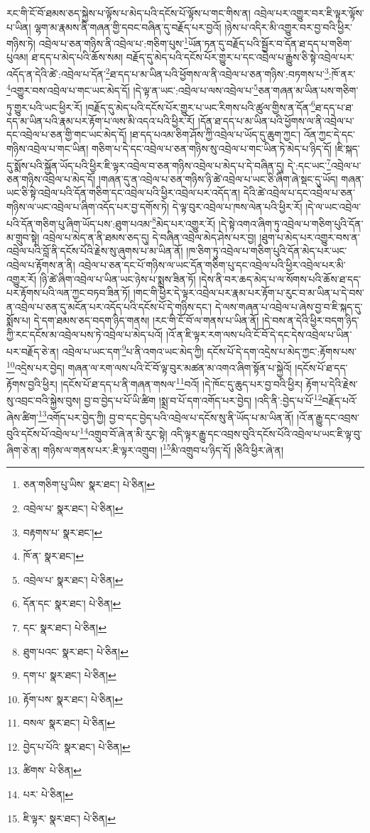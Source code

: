 རང་གི་ངོ་བོ་ཐམས་ཅད་སྐྱེས་པ་ལྟོས་པ་མེད་པའི་དངོས་པོ་ལྟོས་པ་གང་གིས་ན། འབྲེལ་པར་འགྱུར་བར་ཇི་ལྟར་ལྟོས་པ་ཡིན། ལྷག་མ་རྣམས་ནི་གཞན་གྱི་དབང་བཞིན་དུ་བརྗོད་པར་བྱའོ། །ཉེས་པ་འདིར་མི་འགྱུར་བར་བྱ་བའི་ཕྱིར་གཉིས་ཏེ། འབྲེལ་པ་ཅན་གཉིས་ནི་འབྲེལ་པ་:གཅིག་པུས་\footnote{ཅན་གཅིག་པུ་ཡིས་  སྣར་ཐང་།  པེ་ཅིན། }ཡོན་ཏན་དུ་བརྗོད་པའི་སྦྱོར་བ་དོན་ཐ་དད་པ་གཅིག་པུའམ། ཐ་དད་པ་མེད་པའི་ཆོས་སམ། བརྗོད་དུ་མེད་པའི་དངོས་པོར་གྱུར་པ་དང་འབྲེལ་པ་རྒྱུས་ཅི་སྟེ་འབྲེལ་པར་འདོད་ན་དེའི་ཚེ་:འབྲེལ་པ་དོན་\footnote{འབྲེལ་པ་  སྣར་ཐང་།  པེ་ཅིན། }ཐ་དད་པ་མ་ཡིན་པའི་ཕྱོགས་ལ་ནི་འབྲེལ་པ་ཅན་གཉིས་:བཏགས་པ་\footnote{བརྟགས་པ་  སྣར་ཐང་། }:ཁོ་ནར་\footnote{ཁོ་ན་  སྣར་ཐང་། }འགྱུར་བས་འབྲེལ་པ་གང་ཡང་མེད་དོ། །དེ་ལྟ་ན་ཡང་:འབྲེལ་པ་ལས་འབྲེལ་པ་\footnote{འབྲེལ་པ་  སྣར་ཐང་།  པེ་ཅིན། }ཅན་གཞན་མ་ཡིན་པས་གཅིག་ཏུ་གྱུར་པའི་ཡང་ཕྱིར་རོ། །བརྗོད་དུ་མེད་པའི་དངོས་པོར་གྱུར་པ་ཡང་རིགས་པའི་ཚུལ་གྱིས་ན་དོན་\footnote{དོན་དང་  སྣར་ཐང་།  པེ་ཅིན། }ཐ་དད་པ་ཐ་དད་མ་ཡིན་པའི་རྣམ་པར་རྟོག་པ་ལས་མི་འདའ་པའི་ཕྱིར་རོ། །དོན་ཐ་དད་པ་མ་ཡིན་པའི་ཕྱོགས་ལ་ནི་འབྲེལ་པ་དང་འབྲེལ་པ་ཅན་གྱི་གང་ཡང་མེད་དོ། །ཐ་དད་པའམ་ཅིག་ཤོས་ཀྱི་འབྲེལ་པ་ཡོད་དུ་ཆུག་ཀྱང་། འོན་ཀྱང་དེ་དང་གཉིས་འབྲེལ་པ་གང་ཡིན། གཅིག་པ་དེ་དང་འབྲེལ་པ་ཅན་གཉིས་སུ་འབྲེལ་པ་གང་ཡིན་ཏེ་མེད་པ་ཉིད་དོ། །ཇི་སྐད་དུ་སྨོས་པའི་སྐྱོན་ཡོད་པའི་ཕྱིར་ཇི་ལྟར་འབྲེལ་བ་ཅན་གཉིས་འབྲེལ་པ་མེད་པ་དེ་བཞིན་དུ། དེ་:དང་ཡང་\footnote{དང་  སྣར་ཐང་།  པེ་ཅིན། }འབྲེལ་པ་ཅན་གཉིས་འབྲེལ་པ་མེད་དོ། །གཞན་དུ་ན་འབྲེལ་པ་ཅན་གཉིས་ཉི་ཚེ་འབྲེལ་པ་ཡང་ཅི་ཞིག་ཞེ་སྡང་དུ་ཡོད། གཞན་ཡང་ཅི་སྟེ་འབྲེལ་པའི་དོན་གཅིག་དང་འབྲེལ་པའི་ཕྱིར་འབྲེལ་པར་འདོད་ན། དེའི་ཚེ་འབྲེལ་པ་དང་འབྲེལ་པ་ཅན་གཉིས་ལ་ཡང་འབྲེལ་པ་ཞིག་འདོད་པར་བྱ་དགོས་ཏེ། དེ་ལྟ་བུར་འབྲེལ་པ་ཁས་ལེན་པའི་ཕྱིར་རོ། །དེ་ལ་ཡང་འབྲེལ་པའི་དོན་གཅིག་པུ་ཞིག་ཡོད་པས་:ཐུག་པའམ་\footnote{ཐུག་པའང་  སྣར་ཐང་།  པེ་ཅིན། }མེད་པར་འགྱུར་རོ། །དེ་སྟེ་འགའ་ཞིག་ཏུ་འབྲེལ་པ་གཅིག་པུའི་དོན་མ་གྲུབ་སྟེ། འབྲེལ་པ་མེད་ན་ནི་ཐམས་ཅད་དུ། དེ་བཞིན་འབྲེལ་མེད་ཤེས་པར་བྱ། །ཐུག་པ་མེད་པར་འགྱུར་བས་ན་འབྲེལ་པའི་བློ་ནི་དངོས་པོའི་རྗེས་སུ་ཞུགས་པ་མ་ཡིན་ནོ། །ཁ་ཅིག་ཏུ་འབྲེལ་པ་གཅིག་པུའི་དོན་མེད་པར་ཡང་འབྲེལ་པ་རྟོགས་ན་ནི། འབྲེལ་པ་ཅན་དང་པོ་གཉིས་ལ་ཡང་དོན་གཅིག་པུ་དང་འབྲེལ་པའི་ཕྱིར་འབྲེལ་པར་མི་འགྱུར་རོ། །ཉི་ཚེ་ཞིག་འབྲེལ་པ་ཡིན་ཡང་ཉེས་པ་སྨྲས་ཟིན་ཏོ། །དེས་ནི་བར་ཆད་མེད་པ་ལ་སོགས་པའི་ཆོས་ཐ་དད་པར་རྟོགས་པའི་ལན་ཀྱང་བཏབ་ཟིན་ཏོ། །གང་གི་ཕྱིར་དེ་ལྟར་འབྲེལ་པར་རྣམ་པར་རྟོག་པ་རུང་བ་མ་ཡིན་པ་དེ་བས་ན་འབྲེལ་པ་ཅན་དུ་མངོན་པར་འདོད་པའི་དངོས་པོ་དེ་གཉིས་དང་། དེ་ལས་གཞན་པ་འབྲེལ་པ་ཞེས་བྱ་བ་ཇི་སྐད་དུ་སྨོས་པ། དེ་དག་ཐམས་ཅད་བདག་ཉིད་གནས། །རང་གི་ངོ་བོ་ལ་གནས་པ་ཡིན་ནོ། །དེ་བས་ན་དེའི་ཕྱིར་བདག་ཉིད་ཀྱི་རང་དངོས་མ་འབྲེལ་པས་ཏེ་འབྲེལ་པ་མེད་པའོ། །འོ་ན་ཇི་ལྟར་རག་ལས་པའི་ངོ་བོ་དེ་དང་དེས་འབྲེལ་པ་ཡིན་པར་བརྗོད་ཅེ་ན། འབྲེལ་པ་ཡང་དག་\footnote{དག་པ་  སྣར་ཐང་།  པེ་ཅིན། }པ་ནི་འགའ་ཡང་མེད་ཀྱི། དངོས་པོ་དེ་དག་འདྲེས་པ་མེད་ཀྱང་:རྟོགས་པས་\footnote{རྟོག་པས་  སྣར་ཐང་།  པེ་ཅིན། }འདྲེས་པར་བྱེད། གཞན་ལ་རག་ལས་པའི་ངོ་བོ་ལྟ་བུར་མཚན་མ་འགའ་ཞིག་སྟོན་པ་སྐྱེའོ། །དངོས་པོ་ཐ་དད་རྟོགས་བྱའི་ཕྱིར། །དངོས་པོ་ཐ་དད་པ་ནི་གཞན་གསལ་\footnote{བསལ་  སྣར་ཐང་།  པེ་ཅིན། }བའོ། །དེ་ཁོང་དུ་ཆུད་པར་བྱ་བའི་ཕྱིར། རྟོག་པ་དེའི་རྗེས་སུ་འབྲང་བའི་སྐྱེས་བུས། བྱ་བ་བྱེད་པ་པོ་ཡི་ཚིག །སྨྲ་བ་པོ་དག་འགོད་པར་བྱེད། །འདི་ནི་:བྱེད་པ་པོ་\footnote{བྱེད་པ་པོའི་  སྣར་ཐང་།  པེ་ཅིན། }བརྗོད་པའོ་ཞེས་ཚིག་\footnote{ཚིགས་  པེ་ཅིན། }འགོད་པར་བྱེད་ཀྱི། བྱ་བ་དང་བྱེད་པའི་འབྲེལ་པ་དངོས་སུ་ནི་ཡོད་པ་མ་ཡིན་ནོ། །འོ་ན་རྒྱུ་དང་འབྲས་བུའི་དངོས་པོ་འབྲེལ་པ་\footnote{པར་  པེ་ཅིན། }འགྲུབ་བོ་ཞེ་ན་མི་རུང་སྟེ། འདི་ལྟར་རྒྱུ་དང་འབྲས་བུའི་དངོས་པོའི་འབྲེལ་པ་ཡང་ཇི་ལྟ་བུ་ཞིག་ཅེ་ན། གཉིས་ལ་གནས་པར་:ཇི་ལྟར་འགྲུབ། །\footnote{ཇི་ལྟར་  སྣར་ཐང་།  པེ་ཅིན། }མི་འགྲུབ་པ་ཉིད་དོ། །ཅིའི་ཕྱིར་ཞེ་ན། 